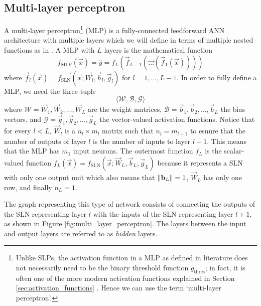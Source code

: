 \subsection{Multi-layer perceptron}
\label{sec:multi_layer_perceptron}
A multi-layer perceptron\footnote{Unlike SLPs, the activation function in a MLP as defined in literature does not necessarily need to be the binary threshold function $g_\text{thres}$; in fact, it is often one of the more modern activation functions explained in Section \ref{sec:activation_functions} \cite{hastie2017,burkov2019}. Hence we can use the term `multi-layer perceptron'.} (MLP) is a fully-connected feedforward ANN architecture with multiple layers which we will define in terms of multiple nested functions as in \citet{burkov2019}.
A MLP with $L$ layers is the mathematical function
\begin{equation}
    f_{\text{MLP}}(\vec{x})
        = \hat{y}
        = f_L \left(
            \vec{f}_{L-1} \left(
                \vec{\dots} \left(
                    \vec{f}_1 \left(
                        \vec{x}
                    \right)
                \right)
            \right)
        \right)
\end{equation}
where $\vec{f}_l(\vec{x}) = \vec{f_{\text{SLN}}}(\vec{x}; \vec{W}_l, \vec{b}_l, \vec{g}_l)$ for $l = 1, \dots, L-1$. 
In order to fully define a MLP, we need the three-tuple
\begin{equation}
    \label{eq:mlp_three_tuple}
    \langle \mathscr{W}, \mathscr{B}, \mathscr{G} \rangle
\end{equation}
where $\mathscr{W} = \vec{W}_1, \vec{W}_2, \dots, \vec{W}_L$ are the weight matrices, $\mathscr{B} = \vec{b}_1, \vec{b}_2, \dots, \vec{b}_L$ the bias vectors, and $\mathscr{G} = \vec{g}_1, \vec{g}_2, \dots, \vec{g}_L$ the vector-valued activation functions.
Notice that for every $l < L$, $\vec{W}_l$ is a $n_l \times m_l$ matrix such that $n_l=m_{l+1}$ to esnure that the number of outputs of layer $l$ is the number of inputs to layer $l+1$.
This means that the MLP has $m_1$ input neurons.
The outermost function $f_L$ is the scalar-valued function $f_L(\vec{x}) = f_{\text{SLN}}(\vec{x}; \vec{W}_L, \vec{b}_L, \vec{g}_L)$ because it represents a SLN with only one output unit which also means that $\left\lVert\mathbf{b}_L\right\rVert=1$, $\vec{W}_L$ has only one row, and finally $n_L=1$.

The graph representing this type of network consists of connecting the outputs of the SLN representing layer $l$ with the inputs of the SLN representing layer $l+1$, as shown in Figure \ref{fig:multi_layer_perceptron}. 
The layers between the input and output layers are referred to as \textit{hidden} layers.

